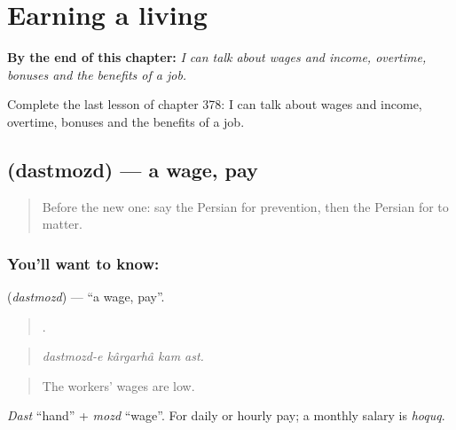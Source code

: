 
\chapter{Earning a living}
\label{ch:fa-earning-a-living}

\begin{chapteropening}
\textbf{By the end of this chapter:} \emph{I can talk about wages and income, overtime, bonuses and the benefits of a job.}

Complete the last lesson of chapter 378: I can talk about wages and income, overtime, bonuses and the benefits of a job.
\end{chapteropening}

\section[\texorpdfstring{\fa{دستمزد} (dastmozd)}{دستمزد (dastmozd)}]{ (dastmozd) — a wage, pay}

\label{lesson:FA-C378-dastmozd}



\begin{quote}
Before the new one: say the Persian for prevention, then the Persian for to matter.
\end{quote}

\subsection*{You'll want to know: }
\textbf{} (\emph{dastmozd}) — \textquotedblleft{}a wage, pay\textquotedblright{}.

\begin{quote}
   .
\end{quote}

\begin{quote}
\emph{dastmozd-e kârgarhâ kam ast.}
\end{quote}

\begin{quote}
The workers' wages are low.
\end{quote}

\emph{Dast} \textquotedblleft{}hand\textquotedblright{} + \emph{mozd} \textquotedblleft{}wage\textquotedblright{}. For daily or hourly pay; a monthly salary is \emph{hoquq}.

